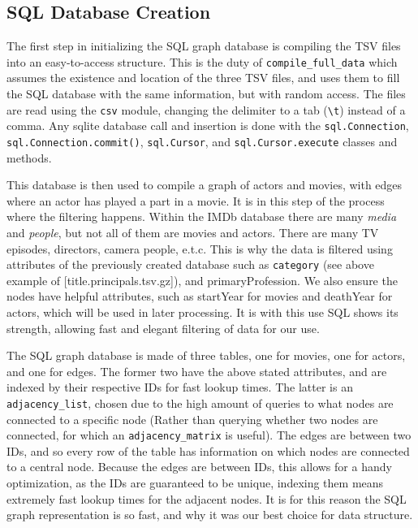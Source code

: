 \documentclass{article}
\begin{document}
\subsection{SQL Database Creation}

The first step in initializing the SQL graph database is compiling the TSV files into an easy-to-access structure. This is the duty of \verb!compile_full_data! which assumes the existence and location of the three TSV files, and uses them to fill the SQL database with the same information, but with random access. The files are read using the \verb!csv! module, changing the delimiter to a tab (\verb!\t!) instead of a comma. Any sqlite database call and insertion is done with the \verb!sql.Connection!, \verb!sql.Connection.commit()!, \verb!sql.Cursor!, and \verb!sql.Cursor.execute! classes and methods.

This database is then used to compile a graph of actors and movies, with edges where an actor has played a part in a movie. It is in this step of the process where the filtering happens. Within the IMDb database there are many \emph{media} and \emph{people}, but not all of them are movies and actors. There are many TV episodes, directors, camera people, e.t.c. This is why the data is filtered using attributes of the previously created database such as \verb+category+ (see above example of [title.principals.tsv.gz]), and primaryProfession. We also ensure the nodes have helpful attributes, such as startYear for movies and deathYear for actors, which will be used in later processing. It is with this use SQL shows its strength, allowing fast and elegant filtering of data for our use. 

The SQL graph database is made of three tables, one for movies, one for actors, and one for edges. The former two have the above stated attributes, and are indexed by their respective IDs for fast lookup times. The latter is an \verb+adjacency_list+, chosen due to the high amount of queries to what nodes are connected to a specific node (Rather than querying whether two nodes are connected, for which an \verb+adjacency_matrix+ is useful). The edges are between two IDs, and so every row of the table has information on which nodes are connected to a central node. Because the edges are between IDs, this allows for a handy optimization, as the IDs are guaranteed to be unique, indexing them means extremely fast lookup times for the adjacent nodes. It is for this reason the SQL graph representation is so fast, and why it was our best choice for data structure.
\end{document}
